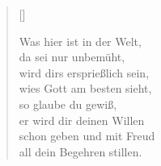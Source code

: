 \begin{center}
\settowidth{\versewidth}{Was hier ist in der Welt,}
\begin{verse}[\versewidth]

   Was hier ist in der Welt,\\
  da sei nur unbemüht,\\
  wird dirs ersprießlich sein,\\
  wies Gott am besten sieht,\\
  so glaube du gewiß,\\
  er wird dir deinen Willen\\
  schon geben und mit Freud\\
  all dein Begehren stillen.
  
\end{verse}
\end{center}


